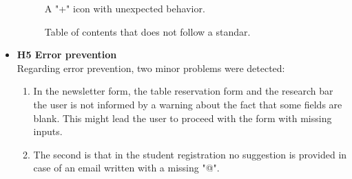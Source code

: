 \begin{itemize}
        \begin{figure}[!ht]
            \begin{minipage}{\linewidth}
                \centering
                \captionsetup{justification=centering}
                \caption{A "+" icon with unexpected behavior.}
                \label{H4-2}
            \end{minipage}
        \end{figure}
        \begin{figure}[!ht]
            \begin{minipage}{\linewidth}
                \centering
                \captionsetup{justification=centering}
                \caption{Table of contents that does not follow a standar.}
                \label{H4-3}
            \end{minipage}
        \end{figure} 
    \item \textbf{H5 Error prevention}\\
        Regarding error prevention, two minor problems were detected:
        \begin{enumerate}
            \item In the newsletter form, the table reservation form and the research bar the user is not informed by a warning about the fact that some fields are blank. This might lead the user to proceed with the form with missing inputs.
            \item The second is that in the student registration no suggestion is provided in case of an email written with a missing "@".

\end{enumerate}
\end{itemize}
